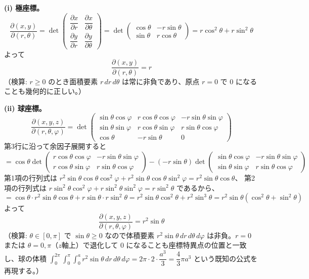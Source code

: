 
\textbf{(i) 極座標。}
\[
\frac{\partial(x,y)}{\partial(r,\theta)} = \det \begin{pmatrix} \dfrac{\partial x}{\partial r} & \dfrac{\partial x}{\partial \theta} \\[2mm] \dfrac{\partial y}{\partial r} & \dfrac{\partial y}{\partial \theta} \end{pmatrix}
= \det \begin{pmatrix} \cos\theta & -r\sin\theta \\ \sin\theta & r\cos\theta \end{pmatrix}
= r\cos^{2}\theta + r\sin^{2}\theta
\]
よって
\[
\boxed{\; \frac{\partial(x,y)}{\partial(r,\theta)} = r \;}
\]
（検算: $r \ge 0$ のとき面積要素 $r\, dr\, d\theta$ は常に非負であり、原点 $r=0$ で $0$ になることも幾何的に正しい。）

\medskip
\noindent
\textbf{(ii) 球座標。}
\[
\frac{\partial(x,y,z)}{\partial(r,\theta,\varphi)}
= \det \begin{pmatrix}
\sin\theta\cos\varphi & r\cos\theta\cos\varphi & -r\sin\theta\sin\varphi \\
\sin\theta\sin\varphi & r\cos\theta\sin\varphi & r\sin\theta\cos\varphi \\
\cos\theta & -r\sin\theta & 0
\end{pmatrix}
\]
第3行に沿って余因子展開すると
\[
= \cos\theta \det\begin{pmatrix} r\cos\theta\cos\varphi & -r\sin\theta\sin\varphi \\ r\cos\theta\sin\varphi & r\sin\theta\cos\varphi \end{pmatrix}
- (-r\sin\theta) \det\begin{pmatrix} \sin\theta\cos\varphi & -r\sin\theta\sin\varphi \\ \sin\theta\sin\varphi & r\sin\theta\cos\varphi \end{pmatrix}
\]
第1項の行列式は $r^{2}\sin\theta\cos\theta\cos^{2}\varphi + r^{2}\sin\theta\cos\theta\sin^{2}\varphi = r^{2}\sin\theta\cos\theta$、
第2項の行列式は $r\sin^{2}\theta\cos^{2}\varphi + r\sin^{2}\theta\sin^{2}\varphi = r\sin^{2}\theta$ であるから、
\[
= \cos\theta \cdot r^{2}\sin\theta\cos\theta + r\sin\theta \cdot r\sin^{2}\theta
= r^{2}\sin\theta\cos^{2}\theta + r^{2}\sin^{3}\theta
= r^{2}\sin\theta(\cos^{2}\theta + \sin^{2}\theta)
\]
よって
\[
\boxed{\; \frac{\partial(x,y,z)}{\partial(r,\theta,\varphi)} = r^{2}\sin\theta \;}
\]
（検算: $\theta \in [0,\pi]$ で $\sin\theta \ge 0$ なので体積要素 $r^{2}\sin\theta\, dr\, d\theta\, d\varphi$ は非負。$r=0$ または $\theta=0,\pi$（$z$軸上）で退化して $0$ になることも座標特異点の位置と一致し、球の体積 $\int_0^{2\pi}\!\!\int_0^{\pi}\!\!\int_0^{a} r^2\sin\theta\, dr\, d\theta\, d\varphi = 2\pi \cdot 2 \cdot \dfrac{a^3}{3} = \dfrac{4}{3}\pi a^3$ という既知の公式を再現する。）
